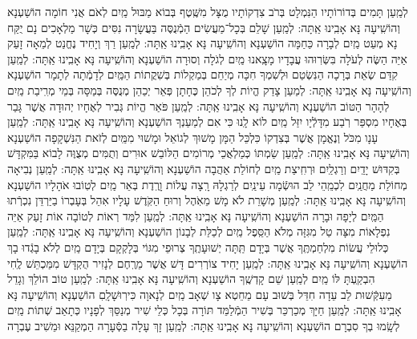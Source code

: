 \documentclass[twoside, openany, parskip=half, 11pt]{book}
\begin{document}
\begin{small}
לְמַֽעַן תָּמִים בְּדוֹרוֹתָיו הַנִּמְלָט בְּרֹב צִדְקוֹתָיו 
	מֻצָּל מִשֶּֽׁטֶף בְּבוֹא מַבּוּל מַֽיִם לְאֹם אֲנִי חוֹמָה 	הוֹשַׁעְנָא וְהוֹשִֽׁיעָה נָּא אָבִֽינוּ אַֽתָּה:
לְמַֽעַן שָׁלֵם בְּכָל־מַעֲשִׂים הַמְֿנֻסֶּה בַּעֲשָׂרָה נִסִּים 
	כְּשָׁר מַלְאָכִים נָם יֻקַּח נָא מְעַט מַֽיִם לְבָרָה כַּחַמָּה 	הוֹשַׁעְנָא וְהוֹשִֽׁיעָה נָּא אָבִֽינוּ אַֽתָּה:
לְמַֽעַן רַךְ וְיָחִיד נֶחֱנַט לְמֵאָה זָעַק אַיֵּה הַשֶּׂה לְעֹלָה 
	בִּשְּׂרֽוּהוּ עֲבָדָיו מָצָֽאנוּ מַֽיִם לְגֹלָה וְסוּרָה 		הוֹשַׁעְנָא וְהוֹשִֽׁיעָה נָּא אָבִֽינוּ אַֽתָּה:
לְמַֽעַן קִדַּם שְׂאֵת בְּרָכָה הַנִּשְׂטַם וּלְשִׁמְךָ חִכָּה 
	מְיַחֵם בְּמַקְלוֹת בְּשִׁקֲתוֹת הַמַּֽיִם לְדָמְֿתָה לְתָמָר 	הוֹשַׁעְנָא וְהוֹשִֽׁיעָה נָּא אָבִֽינוּ אַֽתָּה:
לְמַעַן צָדַק הֱיוֹת לְךָ לְכֹהֵן כֶּחָתָן פְּאֵר יְכַהֵן 
	מְנֻסֶּה בְּמַסָּה בְּמֵי מְרִֽיבַת מַֽיִם לְהָהָר הַטּוֹב 		הוֹשַׁעְנָא וְהוֹשִֽׁיעָה נָּא אָבִֽינוּ אַֽתָּה:
	לְמַֽעַן פֹּאַר הֱיוֹת גְּבִיר לְאֶחָיו יְהוּדָה אֲשֶׁר גָּבַר בְּאֶחָיו 
	מִסְפַּר רֹֽבַע מִדָּלְֿיָו יִזַּל מַֽיִם לוֹא לָֽנוּ כִּי אִם לְמַעַנְךָ 	הוֹשַׁעְנָא וְהוֹשִֽׁיעָה נָּא אָבִֽינוּ אַֽתָּה:
לְמַֽעַן עָנָו מִכֹּל וְנֶאֱמָן אֲשֶׁר בְּצִדְקוֹ כִּלְכֵּל הַמָּן 
	מָשׁוּךְ לְגוֹאֵל וּמָשׁוּי מִמַּֽיִם לְזֹאת הַנִּשְׁקָפָה 		הוֹשַׁעְנָא וְהוֹשִֽׁיעָה נָּא אָבִֽינוּ אַֽתָּה:
לְמַֽעַן שַׂמְתּוֹ כְּמַלְאֲכֵי מְרוֹמִים הַלּוֹבֵשׁ אוּרִים וְתֻמִּים 
	מְצֻוֶּה לָבוֹא בַּמִּקְדָּשׁ בְּקִדּוּשׁ יָדַֽיִם וְרַגְלַֽיִם וּרְחִֽיצַת מַֽיִם 
	לְחוֹלַת אַהֲבָה 						הוֹשַׁעְנָא וְהוֹשִֽׁיעָה נָּא אָבִֽינוּ אַֽתָּה:
לְמַֽעַן נְבִיאָה מְחוֹלַת מַחֲנַֽיִם לִכְמֵֽהֵי לֵב הוּשְֿׂמָה עֵינַֽיִם 
	לְרַגְלָהּ רָֽצָה עֲלוֹת וָרֶֽדֶת בְּאֵר מַֽיִם לְטֽוֹבוּ אֹהָלָיו 	הוֹשַׁעְנָא וְהוֹשִֽׁיעָה נָּא אָבִֽינוּ אַֽתָּה:
לְמַֽעַן מְשָׁרֵת לֹא מָשׁ מֵאֹֽהֶל וְרוּחַ הַקֹּֽדֶשׁ עָלָיו אִהֵל 
	בְּעָבְרוֹ בַיַּרְדֵּן נִכְרְֿתוּ הַמַּֽיִם לְיָפָה וּבָרָה 		הוֹשַׁעְנָא וְהוֹשִֽׁיעָה נָּא אָבִֽינוּ אַֽתָּה:
לְמַֽעַן לִמַּד רְאוֹת לְטוֹבָה אוֹת זָעַק אַיֵּה נִפְלָאוֹת 
	מִצָּה טַל מִגִּזָּה מְלֹא הַסֵּֽפֶל מַֽיִם לְכַלַּת לְבָנוֹן 		הוֹשַׁעְנָא וְהוֹשִֽׁיעָה נָּא אָבִֽינוּ אַֽתָּה:
לְמַֽעַן כְּלוּלֵי עֲשׂוֹת מִלְחַמְתֶּֽךָ אֲשֶׁר בְּיָדָם תַּֽתָּה יְשׁוּעָתֶֽךָ 
	צְרוּפֵי מִגּוֹי בְּלָקְקָם בְּיָדָם מַֽיִם לְלֹא בָגְֿדוּ בָךְ 	הוֹשַׁעְנָא וְהוֹשִֽׁיעָה נָּא אָבִֽינוּ אַֽתָּה:
לְמַֽעַן יָחִיד צוֹרְרִים דָּשׁ אֲשֶׁר מֵרֶֽחֶם לְנָזִיר הֻקְדָּשׁ 
	מִמַּכְתֵּשׁ לֶֽחִי הִבְקַֽעְתָּ לּוֹ מַֽיִם לְמַֽעַן שֵׁם קָדְשֶֽׁךָ 	הוֹשַׁעְנָא וְהוֹשִֽׁיעָה נָּא אָבִֽינוּ אַֽתָּה:
לְמַֽעַן טוֹב הוֹלֵךְ וְגָדֵל מֵעִקְּֿשׁוּת לֵב עֵדָה חִדֵּל 
	בְּשׁוּב עָם מֵחֵטְא צָו שְׁאָב מַֽיִם לְנָאוָה כִּירֽוּשָׁלָֽםִ 	הוֹשַׁעְנָא וְהוֹשִֽׁיעָה נָּא אָבִֽינוּ אַֽתָּה:
לְמַֽעַן חַיָּךְ מְכַרְכֵּר בְּשִׁיר הַמְֿלַמֵּד תּוֹרָה בְּכָל כְּלֵי שִׁיר 
	מְנַסֵּךְ לְפָנָיו כְּתָאַב שְׁתוֹת מַֽיִם לְשָֽׂמוּ בְךָ סִבְרָם 	הוֹשַׁעְנָא וְהוֹשִֽׁיעָה נָּא אָבִֽינוּ אַֽתָּה:
לְמַֽעַן זָךְ עָלָה בַסְּֿעָרָה הַמְקַנֵּא וּמֵשִׁיב עֶבְרָה 

\end{small}
\end{document}
